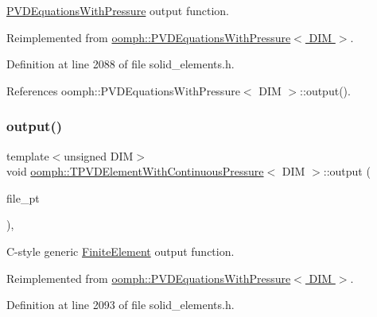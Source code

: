 \hyperlink{classoomph_1_1PVDEquationsWithPressure}{P\+V\+D\+Equations\+With\+Pressure} output function. 



Reimplemented from \hyperlink{classoomph_1_1PVDEquationsWithPressure_a3522de42dcebba5f7531c5913857303d}{oomph\+::\+P\+V\+D\+Equations\+With\+Pressure$<$ D\+I\+M $>$}.



Definition at line 2088 of file solid\+\_\+elements.\+h.



References oomph\+::\+P\+V\+D\+Equations\+With\+Pressure$<$ D\+I\+M $>$\+::output().

\mbox{\label{classoomph_1_1TPVDElementWithContinuousPressure_a082f3c2e891783a923daeaee5686203c}} 
\subsubsection{\texorpdfstring{output()}{output()}\hspace{0.1cm}{\footnotesize\ttfamily [3/4]}}
{\footnotesize\ttfamily template$<$unsigned D\+IM$>$ \\
void \hyperlink{classoomph_1_1TPVDElementWithContinuousPressure}{oomph\+::\+T\+P\+V\+D\+Element\+With\+Continuous\+Pressure}$<$ D\+IM $>$\+::output (\begin{DoxyParamCaption}\item[{F\+I\+LE $\ast$}]{file\+\_\+pt }\end{DoxyParamCaption})\hspace{0.3cm}{\ttfamily [inline]}, {\ttfamily [virtual]}}



C-\/style generic \hyperlink{classoomph_1_1FiniteElement}{Finite\+Element} output function. 



Reimplemented from \hyperlink{classoomph_1_1PVDEquationsWithPressure_ae6d9a646cfd9be12134aeba45249d7c7}{oomph\+::\+P\+V\+D\+Equations\+With\+Pressure$<$ D\+I\+M $>$}.



Definition at line 2093 of file solid\+\_\+elements.\+h.



